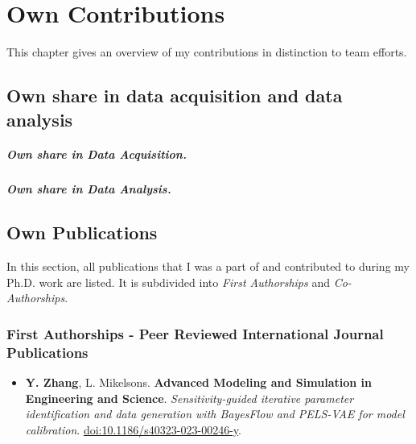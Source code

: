 \chapter*{Own Contributions}
\label{chap:contributions}

This chapter gives an overview of my contributions in distinction to team efforts.


\section*{Own share in data acquisition and data analysis}
{}
\label{sec:own-data-acquisition}

    
\lipsum[1]

\paragraph{Own share in Data Acquisition.}
\lipsum[1]  

\paragraph{Own share in Data Analysis.}
\lipsum[1] 
        
        

\section*{Own Publications}
\label{sec:own-publications}

In this section, all publications that I was a part of and contributed to during my Ph.D. work are listed. It is subdivided into \textit{First Authorships} and \textit{Co-Authorships}.
\hfill \break

\subsection*{First Authorships - Peer Reviewed International Journal Publications} \label{sec:publications:peer_reviewed_journal_first}

\begin{itemize}
    \item[] \textbf{Y. Zhang}, L. Mikelsons. \textbf{Advanced Modeling and Simulation in Engineering and Science}. \textit{Sensitivity-guided iterative parameter identification and data generation with BayesFlow and PELS-VAE for model calibration}. \url{doi:10.1186/s40323-023-00246-y}.
\end{itemize}


